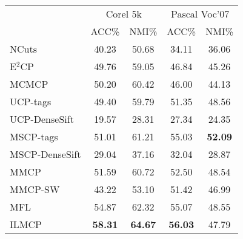 \begin{table}[t]
    \label{tab4:2case}
    \centering
	\setlength{\tabcolsep}{15pt}
    \begin{tabular}{lcccc}
        \toprule
        &\multicolumn{2}{c}{Corel 5k} & \multicolumn{2}{c}{Pascal Voc'07} \\
        \cmidrule(lr){2-3}
        \cmidrule(lr){4-5}
        & ACC\% & NMI\% & ACC\% & NMI\% \\
        \midrule
        NCuts\cite{shi2000normalized} & 40.23 & 50.68 & 34.11 & 36.06 \\ 
        E$^2$CP\cite{lu2010constrained} & 49.76 & 59.05 & 46.84 & 45.26 \\ 
        MCMCP\cite{fu2012modalities} & 50.20 & 60.42 & 46.00 & 44.13 \\
        UCP-tags\cite{lu2013unified} & 49.40 & 59.79 & 51.35 & 48.56 \\ 
        UCP-DenseSift\cite{lu2013unified} & 19.57 & 28.31 & 27.34 & 24.35 \\ 
        MSCP-tags\cite{lu2013exhaustive} & 51.01 & 61.21 & 55.03 & \textbf{52.09} \\ 
        MSCP-DenseSift\cite{lu2013exhaustive} & 29.04 & 37.16 & 32.04 & 28.87 \\ 
        MMCP\cite{fu2011multi} & 51.59 & 60.72 & 52.50 & 48.54 \\ 
        MMCP-SW\cite{fu2011multi} & 43.22 & 53.10 & 51.42 & 46.99 \\  
        MFL & 54.87 & 62.32 & 55.07 & 48.55 \\ 
        ILMCP & \textbf{58.31} & \textbf{64.67} & \textbf{56.03} & 47.79 \\
        \bottomrule
    \end{tabular}
\end{table}


